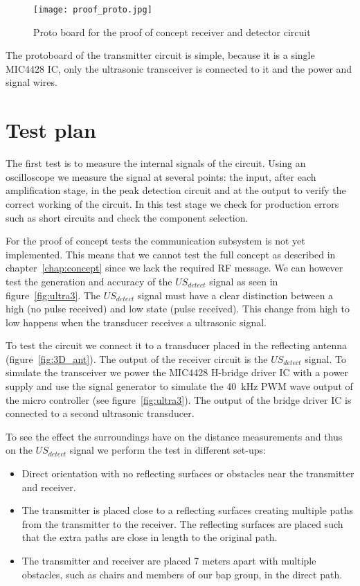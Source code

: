 \begin{figure}[H]
\centering
\texttt{[image: proof\_proto.jpg]}
\caption{Proto board for the proof of concept receiver and detector circuit}\label{fig:proto}
\label{fig:protoboard}
\end{figure}

The protoboard of the transmitter circuit is simple, because it is a single MIC4428 \cite{MIC4428}
 IC, only the ultrasonic transceiver is connected to it and the power and signal wires.

\section{Test plan}
The first test is to measure the internal signals of the circuit.
Using an oscilloscope we measure the signal at several points: the input, after each amplification stage, in the peak detection circuit and at the output to verify the correct working of the circuit.
In this test stage we check for production errors such as short circuits and check the component selection.

For the proof of concept tests the communication subsystem is not yet implemented.
This means that we cannot test the full concept as described in chapter~\ref{chap:concept} since we lack the required RF message.
We can however test the generation and accuracy of the $US_{detect}$ signal as seen in figure~\ref{fig:ultra3}.
The $US_{detect}$ signal must have a clear distinction between a high (no pulse received) and low state (pulse received).
This change from high to low happens when the transducer receives a ultrasonic signal.

To test the circuit we connect it to a transducer placed in the reflecting antenna (figure~\ref{fig:3D_ant}).
The output of the receiver circuit is the $US_{detect}$ signal.
To simulate the transceiver we power the MIC4428 \cite{MIC4428}
H-bridge driver IC with a power supply and use the signal generator to simulate the \SI{40}{\kilo\hertz} PWM wave output of the micro controller (see figure~\ref{fig:ultra3}).
The output of the bridge driver IC is connected to a second ultrasonic transducer.

To see the effect the surroundings have on the distance measurements and thus on the $US_{detect}$ signal we perform the test in different set-ups:

\begin{itemize}
\item
Direct orientation with no reflecting surfaces or obstacles near the transmitter and receiver.
\item
The transmitter is placed close to a reflecting surfaces creating multiple paths from the transmitter to the receiver.
The reflecting surfaces are placed such that the extra paths are close in length to the original path.
\item
The transmitter and receiver are placed 7 meters apart with multiple obstacles, such as chairs and members of our bap group, in the direct path.
\end{itemize}

